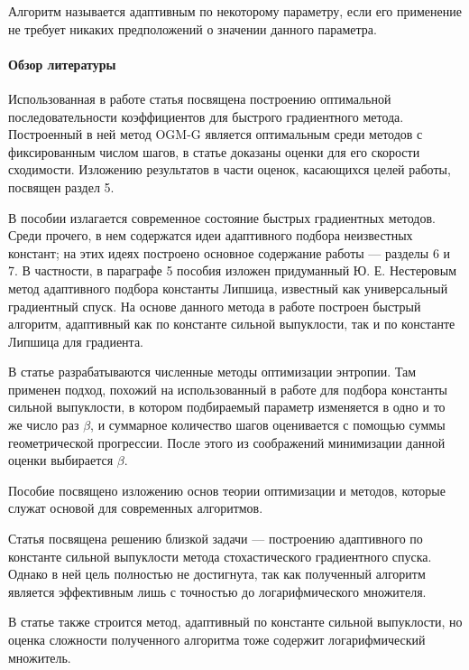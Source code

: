 \documentclass{crm-article}
\begin{document}
Алгоритм называется адаптивным по некоторому параметру, если его применение не требует никаких предположений о значении данного параметра.

\paragraph{Обзор литературы}

Использованная в работе статья \cite{kim2018fessler} посвящена построению оптимальной последовательности коэффициентов для быстрого градиентного метода. Построенный в ней метод OGM-G является оптимальным среди методов с фиксированным числом шагов, в статье доказаны оценки для его скорости сходимости. Изложению результатов \cite{kim2018fessler} в части оценок, касающихся целей работы, посвящен раздел 5.

В пособии \cite{gasnikov2017universal} излагается современное состояние быстрых градиентных методов. Среди прочего, в нем содержатся идеи адаптивного подбора неизвестных констант; на этих идеях построено основное содержание работы --- разделы 6 и 7. В частности, в параграфе 5 пособия изложен придуманный Ю. Е. Нестеровым метод адаптивного подбора константы Липшица, известный как универсальный градиентный спуск. На основе данного метода в работе построен быстрый алгоритм, адаптивный как по константе сильной выпуклости, так и по константе Липшица для градиента.

В статье \cite{gasnikov2018entropy} разрабатываются численные методы оптимизации энтропии. Там применен подход, похожий на использованный в работе для подбора константы сильной выпуклости, в котором подбираемый параметр изменяется в одно и то же число раз $\beta$, и суммарное количество шагов оценивается с помощью суммы геометрической прогрессии. После этого из соображений минимизации данной оценки выбирается $\beta$.

Пособие \cite{nesterov2010introductory} посвящено изложению основ теории оптимизации и методов, которые служат основой для современных алгоритмов.

Статья \cite{lei2019jordan} посвящена решению близкой задачи --- построению адаптивного по константе сильной выпуклости метода стохастического градиентного спуска. Однако в ней цель полностью не достигнута, так как полученный алгоритм является эффективным лишь с точностью до логарифмического множителя.

В статье \cite{fercoq2016qu} также строится метод, адаптивный по константе сильной выпуклости, но оценка сложности полученного алгоритма тоже содержит логарифмический множитель.
\end{document}
